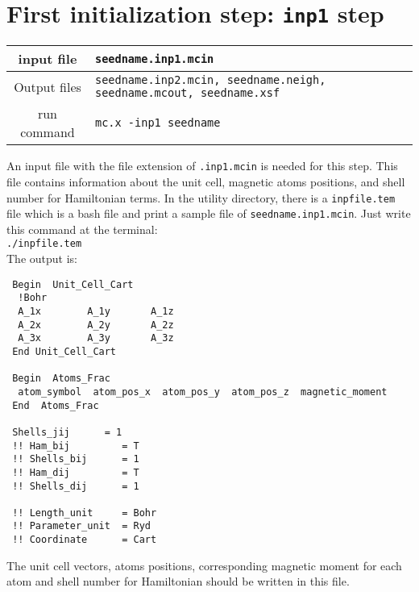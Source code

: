\documentclass[10pt]{report}
\begin{document}
\section{First initialization step: {\tt inp1} step}
\begin{center}
\begin{tabular}{|c|p{10cm}|}
\toprule\hline
input file   & {\tt seedname.inp1.mcin}\\
\hline  
Output files & {\tt seedname.inp2.mcin, seedname.neigh, seedname.mcout, seedname.xsf}\\
\hline
run command  & {\tt mc.x -inp1 seedname}\\
\hline\bottomrule
\end{tabular}
\end{center}
An input file with the file extension of {\tt .inp1.mcin} is needed for this step.
This file contains information about the unit cell, magnetic atoms positions, 
and shell number for Hamiltonian terms. 
In the utility directory, there is a {\tt inpfile.tem} file which is a bash file and print a sample file of 
{\tt seedname.inp1.mcin}. Just write this command at the terminal:\\
{\tt ./inpfile.tem}\\
The output is:
{\scriptsize    
\begin{verbatim}
 Begin  Unit_Cell_Cart
  !Bohr
  A_1x        A_1y       A_1z  
  A_2x        A_2y       A_2z  
  A_3x        A_3y       A_3z  
 End Unit_Cell_Cart 

 Begin  Atoms_Frac
  atom_symbol  atom_pos_x  atom_pos_y  atom_pos_z  magnetic_moment  
 End  Atoms_Frac
 
 Shells_jij      = 1 
 !! Ham_bij         = T 
 !! Shells_bij      = 1 
 !! Ham_dij         = T 
 !! Shells_dij      = 1 

 !! Length_unit     = Bohr
 !! Parameter_unit  = Ryd 
 !! Coordinate      = Cart 
\end{verbatim}
}
The unit cell vectors, atoms positions, corresponding magnetic moment for each atom and shell number for Hamiltonian should be written in this file.
\end{document}
